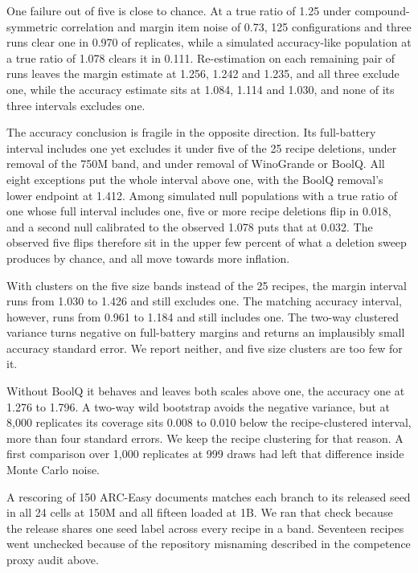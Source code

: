 One failure out of five is close to chance. At a true ratio of 1.25 under compound-symmetric correlation and margin item noise of 0.73, 125 configurations and three runs clear one in 0.970 of replicates, while a simulated accuracy-like population at a true ratio of 1.078 clears it in 0.111. Re-estimation on each remaining pair of runs leaves the margin estimate at 1.256, 1.242 and 1.235, and all three exclude one, while the accuracy estimate sits at 1.084, 1.114 and 1.030, and none of its three intervals excludes one.

The accuracy conclusion is fragile in the opposite direction. Its full-battery interval includes one yet excludes it under five of the 25 recipe deletions, under removal of the 750M band, and under removal of WinoGrande or BoolQ. All eight exceptions put the whole interval above one, with the BoolQ removal's lower endpoint at 1.412. Among simulated null populations with a true ratio of one whose full interval includes one, five or more recipe deletions flip in 0.018, and a second null calibrated to the observed 1.078 puts that at 0.032. The observed five flips therefore sit in the upper few percent of what a deletion sweep produces by chance, and all move towards more inflation.

With clusters on the five size bands instead of the 25 recipes, the margin interval runs from 1.030 to 1.426 and still excludes one. The matching accuracy interval, however, runs from 0.961 to 1.184 and still includes one. The two-way clustered variance turns negative on full-battery margins and returns an implausibly small accuracy standard error. We report neither, and five size clusters are too few for it.

Without BoolQ it behaves and leaves both scales above one, the accuracy one at 1.276 to 1.796. A two-way wild bootstrap avoids the negative variance, but at 8,000 replicates its coverage sits 0.008 to 0.010 below the recipe-clustered interval, more than four standard errors. We keep the recipe clustering for that reason. A first comparison over 1,000 replicates at 999 draws had left that difference inside Monte Carlo noise.

A rescoring of 150 ARC-Easy documents matches each branch to its released seed in all 24 cells at 150M and all fifteen loaded at 1B. We ran that check because the release shares one seed label across every recipe in a band. Seventeen recipes went unchecked because of the repository misnaming described in the competence proxy audit above.

